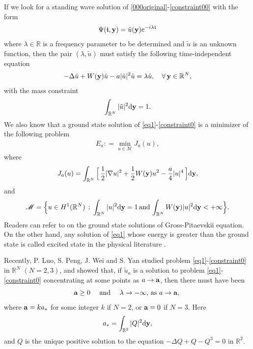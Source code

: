 \documentclass[10pt, reqno]{amsart}
\numberwithin{equation}{section}
\theoremstyle{definition}
\begin{document}
\smallskip
If we look for a standing wave solution of \eqref{000original}-\eqref{constraint00} with the form
$$
\Psi({\mathfrak t}, {\bf y}) = \tilde u({\bf y}) e^{-i \lambda {\mathfrak t}}
$$
where $\lambda \in {\mathbb R}$ is a frequency parameter to be determined and $\tilde u$ is an unknown function,
then the pair $(\lambda, \tilde u)$ must satisfy the following time-independent equation
\begin{align} \label{eq1}
 - \Delta \tilde u + W({\bf y}) \tilde u -a |\tilde u|^2 \tilde u = \lambda \tilde u,
\quad \forall\,{\bf y} \in \mathbb{R}^N,
\end{align}
with the mass constraint
\begin{align} \label{constraint0}
 \int_{{\mathbb R}^N} |\tilde u|^2 {\mathrm d} {\bf y} =1.
\end{align}
We also know that a ground state solution of \eqref{eq1}-\eqref{constraint0} is a minimizer of the following problem
\begin{align}\label{minimzation}
 E_a : = \min_{ u \in \mathscr M} J_a (u),
\end{align}
where
\[ J_a (u) = \int_{{\mathbb R}^N} \Big[\, \frac{1}{2}| \nabla u|^2 + \frac{1}{2} W({\bf y}) u^2 -\frac a 4 |u|^4 \,\Big] {\mathrm d} {\bf y}, \]
and
\[\mathscr M = \Big\{ u \in H^1({\mathbb R}^N)\, :\, \int_{{\mathbb R}^N} |u|^2 {\mathrm d} {\bf y} =1\,\text{and} \,\int_{{\mathbb R}^N} W({\bf y}) |u|^2 {\mathrm d} {\bf y} <+\infty\Big\}. \]
 Readers can refer to \cite{numerics, baoREVIEW, GS, Guo, Guo1, KG} on the ground state solutions of Gross-Pitaevskii equation.
 On the other hand, any solution of \eqref{eq1} whose energy is greater than the ground state is called excited state in the physical literature \cite{Bao}.

\smallskip
 Recently, P. Luo, S. Peng, J. Wei and S. Yan \cite{Luo} studied problem \eqref{eq1}-\eqref{constraint0} in ${\mathbb R}^N$ $ (N=2, 3)$,
and showed that, if $\tilde u_a$ is a solution to problem \eqref{eq1}-\eqref{constraint0} concentrating at some points as $a\rightarrow {\bf a}$, then there must have been
\[ \text{${\bf a} \geq 0$ \quad and \quad $\lambda\to -\infty, $ as $a\to {\bf a}$, } \]
where ${\bf a} = k a_* $ for some integer $k$ if $N=2$, or ${\bf a} =0$ if $N=3$. Here
$$
a_*= \int_{{\mathbb R}^2} |Q|^2 {\mathrm d} {\bf y},
$$
and $Q$ is the unique positive solution to the equation
$
- \Delta Q + Q - Q^3=0
$
in $ \mathbb{R}^2. $
\end{document}
